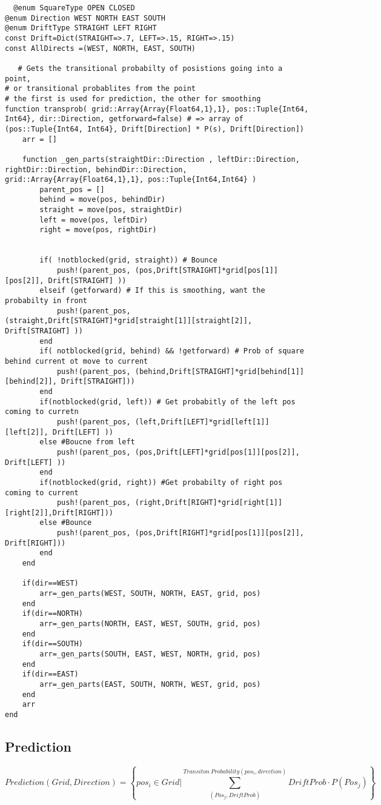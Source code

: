 \documentclass[11pt]{article}
\begin{document}
\begin{verbatim}
  @enum SquareType OPEN CLOSED
@enum Direction WEST NORTH EAST SOUTH
@enum DriftType STRAIGHT LEFT RIGHT
const Drift=Dict(STRAIGHT=>.7, LEFT=>.15, RIGHT=>.15)
const AllDirects =(WEST, NORTH, EAST, SOUTH)

   # Gets the transitional probabilty of posistions going into a point,
# or transitional probablites from the point
# the first is used for prediction, the other for smoothing
function transprob( grid::Array{Array{Float64,1},1}, pos::Tuple{Int64, Int64}, dir::Direction, getforward=false) # => array of  (pos::Tuple{Int64, Int64}, Drift[Direction] * P(s), Drift[Direction])
	arr = []

	function _gen_parts(straightDir::Direction , leftDir::Direction, rightDir::Direction, behindDir::Direction, grid::Array{Array{Float64,1},1}, pos::Tuple{Int64,Int64} )
		parent_pos = []
		behind = move(pos, behindDir)
		straight = move(pos, straightDir)
		left = move(pos, leftDir)
		right = move(pos, rightDir)


		if( !notblocked(grid, straight)) # Bounce
			push!(parent_pos, (pos,Drift[STRAIGHT]*grid[pos[1]][pos[2]], Drift[STRAIGHT] ))
		elseif (getforward) # If this is smoothing, want the probabilty in front
			push!(parent_pos, (straight,Drift[STRAIGHT]*grid[straight[1]][straight[2]], Drift[STRAIGHT] ))
		end
		if( notblocked(grid, behind) && !getforward) # Prob of square behind current ot move to current
			push!(parent_pos, (behind,Drift[STRAIGHT]*grid[behind[1]][behind[2]], Drift[STRAIGHT]))
		end
		if(notblocked(grid, left)) # Get probabitly of the left pos coming to curretn
			push!(parent_pos, (left,Drift[LEFT]*grid[left[1]][left[2]], Drift[LEFT] ))
		else #Boucne from left
			push!(parent_pos, (pos,Drift[LEFT]*grid[pos[1]][pos[2]], Drift[LEFT] ))
		end
		if(notblocked(grid, right)) #Get probabilty of right pos coming to current
			push!(parent_pos, (right,Drift[RIGHT]*grid[right[1]][right[2]],Drift[RIGHT]))
		else #Bounce
			push!(parent_pos, (pos,Drift[RIGHT]*grid[pos[1]][pos[2]], Drift[RIGHT]))
		end
	end

	if(dir==WEST)
		arr=_gen_parts(WEST, SOUTH, NORTH, EAST, grid, pos)
	end
	if(dir==NORTH)
		arr=_gen_parts(NORTH, EAST, WEST, SOUTH, grid, pos)
	end
	if(dir==SOUTH)
		arr=_gen_parts(SOUTH, EAST, WEST, NORTH, grid, pos)
	end
	if(dir==EAST)
		arr=_gen_parts(EAST, SOUTH, NORTH, WEST, grid, pos)
	end
	arr
end

\end{verbatim}

\subsection{Prediction}
\label{sec:orgbe8b4f7}
$$Prediction(Grid, Direction) = \left\{pos_i \in Grid | \sum^{Transiton\ Probability(pos_i, direction)}_{(Pos_j, DriftProb)} DriftProb \cdot P(Pos_j) \right \}$$
\end{document}
